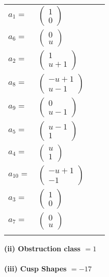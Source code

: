 \documentclass[1p]{elsarticle_modified}
\theoremstyle{definition}
\begin{document}
\begin{tabular}{m{7pt} m{180pt} m{7pt} m{180pt} }
\flushright $a_{1}=$&$\begin{pmatrix}1\\0\end{pmatrix}$ \\
\flushright $a_{6}=$&$\begin{pmatrix}0\\u\end{pmatrix}$ \\
\flushright $a_{2}=$&$\begin{pmatrix}1\\u+1\end{pmatrix}$ \\
\flushright $a_{8}=$&$\begin{pmatrix}- u+1\\u-1\end{pmatrix}$ \\
\flushright $a_{9}=$&$\begin{pmatrix}0\\u-1\end{pmatrix}$ \\
\flushright $a_{5}=$&$\begin{pmatrix}u-1\\1\end{pmatrix}$ \\
\flushright $a_{4}=$&$\begin{pmatrix}u\\1\end{pmatrix}$ \\
\flushright $a_{10}=$&$\begin{pmatrix}- u+1\\-1\end{pmatrix}$ \\
\flushright $a_{3}=$&$\begin{pmatrix}1\\0\end{pmatrix}$ \\
\flushright $a_{7}=$&$\begin{pmatrix}0\\u\end{pmatrix}$\\&\end{tabular}
\flushleft \textbf{(ii) Obstruction class $= 1$}\\~\\
\flushleft \textbf{(iii) Cusp Shapes $= -17$}\\~\\
\end{document}
